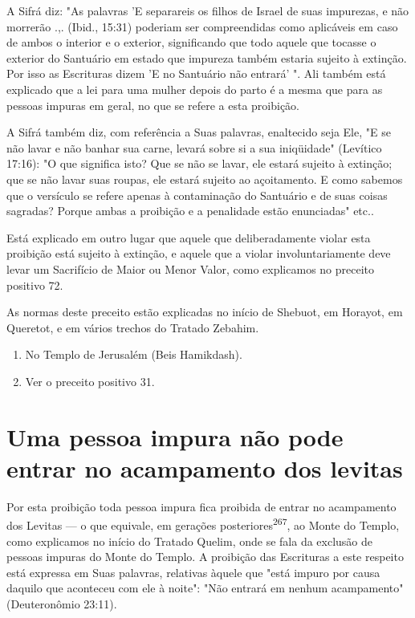\begin{itemize}
\begin{enumrate}
\begin{itemize}
\begin{itemize}
\begin{itemize}
A Sifrá diz: "As palavras 'E separareis os filhos de Israel de suas
im­purezas, e não morrerão .,. (Ibid., 15:31) poderiam ser compreendidas
como aplicáveis em caso de ambos o interior e o exterior, significando
que todo aquele que tocasse o exterior do Santuário em estado que
impureza também estaria sujeito à extinção. Por isso as Escrituras dizem
'E no Santuário não entrará' ". Ali também está explicado que a lei para
uma mulher depois do parto é a mes­ma que para as pessoas impuras em
geral, no que se refere a esta proibição.

A Sifrá também diz, com referência a Suas palavras, enaltecido seja Ele,
"E se não lavar e não banhar sua carne, levará sobre si a sua
iniqüidade" (Levítico 17:16): "O que significa isto? Que se não se
lavar, ele estará sujeito à extinção; que se não lavar suas roupas, ele
estará sujeito ao açoitamento. E como sabemos que o versículo se refere
apenas à contaminação do Santuário e de suas coisas sagradas? Porque
ambas a proibição e a penalidade estão enun­ciadas" etc..

Está explicado em outro lugar que aquele que deliberadamente vio­lar
esta proibição está sujeito à extinção, e aquele que a violar
involuntariamen­te deve levar um Sacrifício de Maior ou Menor Valor,
como explicamos no pre­ceito positivo 72.

As normas deste preceito estão explicadas no início de Shebuot, em
Horayot, em Queretot, e em vários trechos do Tratado Zebahim.


\begin{enumerate}
\def\labelenumi{\arabic{enumi}.}
\setcounter{enumi}{264}
\item
 
 No Templo de Jerusalém (Beis Hamikdash).
 
\item
 
 Ver o preceito positivo 31.
 
\end{enumerate}



\section{Uma pessoa impura não pode entrar no acampamento dos levitas}

Por esta proibição toda pessoa impura fica proibida de entrar no
acampamento dos Levitas --- o que equivale, em gerações
posteriores\textsuperscript{267}, ao Monte do Templo, como explicamos no
início do Tratado Quelim, onde se fa­la da exclusão de pessoas impuras
do Monte do Templo. A proibição das Escri­turas a este respeito está
expressa em Suas palavras, relativas àquele que "está impuro por causa
daquilo que aconteceu com ele à noite": "Não entrará em nenhum
acampamento" (Deuteronômio 23:11).


\end{itemize}
\end{itemize}
\end{itemize}
\end{enumrate}
\end{itemize}
